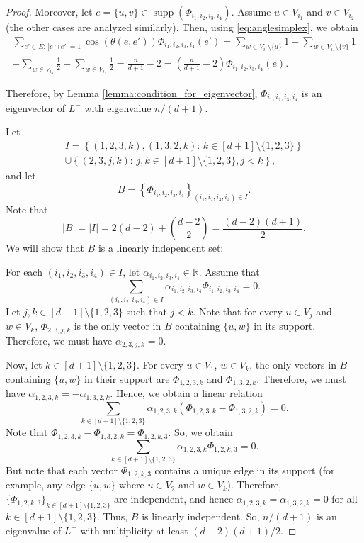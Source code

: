 \documentclass[a4paper,11pt]{article}
\theoremstyle{plain}
\theoremstyle{definition}
\newcommand{\Rea}{{\mathbb R}}
\DeclareMathOperator{\supp}{\text{supp}}
\begin{document}
\begin{proof}
Moreover, let $e=\{u,v\}\in\supp(\Phi_{i_1,i_2,i_3,i_4})$. 
Assume $u\in V_{i_1}$ and $v\in V_{i_2}$ (the other cases are analyzed similarly). Then, using \eqref{eq:anglesimplex}, we obtain
\begin{multline*}
        \sum_{e'\in E:\, |e\cap e'|=1} \cos(\theta(e,e'))\Phi_{i_1,i_2,i_3,i_4}(e')=\sum_{w\in V_{i_1}\setminus\{u\}} 1 + \sum_{w\in V_{i_2}\setminus\{v\}} 1 \\-\sum_{w\in V_{i_3}}\frac{1}{2}-\sum_{w\in V_{i_4}}\frac{1}{2}= \frac{n}{d+1}-2= \left(\frac{n}{d+1}-2\right)\Phi_{i_1,i_2,i_3,i_4}(e).
\end{multline*}
 
Therefore, by Lemma \ref{lemma:condition_for_eigenvector}, $\Phi_{i_1,i_2,i_3,i_4}$ is an eigenvector of $L^{-}$ with eigenvalue $n/(d+1)$.

Let 
\begin{multline*}
    I=  \left\{ (1,2,3,k),(1,3,2,k) :\, k\in [d+1]\setminus\{1,2,3\}\right\}
    \\
    \cup \left\{ (2,3,j,k)  :\, j,k\in[d+1]\setminus\{1,2,3\},j<k \right\},
\end{multline*}
and let
\[
    B= \left\{ \Phi_{i_1,i_2,i_3,i_4}\right\}_{(i_1,i_2,i_3,i_4)\in I}.
\]
Note that
\[
    |B|= |I|= 2(d-2)+ \binom{d-2}{2} = \frac{(d-2)(d+1)}{2}.
\]
We will show that $B$ is a linearly independent set:

For each $(i_1,i_2,i_3,i_4)\in I$, let $\alpha_{i_1,i_2,i_3,i_4}\in \Rea$. Assume that
\[
    \sum_{(i_1,i_2,i_3,i_4)\in I} \alpha_{i_1,i_2,i_3,i_4} \Phi_{i_1,i_2,i_3,i_4}=0.
\]
Let $j,k\in[d+1]\setminus\{1,2,3\}$ such that $j<k$. Note that for every $u\in V_j$ and $w\in V_k$, $\Phi_{2,3,j,k}$ is the only vector in $B$ containing $\{u,w\}$ in its support. Therefore, we must have $\alpha_{2,3,j,k}=0$.

Now, let $k\in [d+1]\setminus\{1,2,3\}$. For every $u\in V_1$, $w\in V_k$, the only vectors in $B$ containing $\{u,w\}$ in their support are $\Phi_{1,2,3,k}$ and $\Phi_{1,3,2,k}$. Therefore, we must have 
$\alpha_{1,2,3,k}=-\alpha_{1,3,2,k}$.
Hence, we obtain a linear relation
\[
    \sum_{k\in[d+1]\setminus\{1,2,3\}} \alpha_{1,2,3,k} (\Phi_{1,2,3,k}-\Phi_{1,3,2,k})=0.
\]
Note that $\Phi_{1,2,3,k}-\Phi_{1,3,2,k}=\Phi_{1,2,k,3}$. So, we obtain
\[
    \sum_{k\in[d+1]\setminus\{1,2,3\}} \alpha_{1,2,3,k} \Phi_{1,2,k,3}=0.
\]
But note that each vector $\Phi_{1,2,k,3}$ contains a unique edge in its support (for example, any edge $\{u,w\}$ where $u\in V_2$ and $w\in V_k$). Therefore, $\{\Phi_{1,2,k,3}\}_{k\in[d+1]\setminus\{1,2,3\}}$ are independent, and hence $\alpha_{1,2,3,k}=\alpha_{1,3,2,k}=0$ for all $k\in[d+1]\setminus\{1,2,3\}$. Thus, $B$ is linearly independent.
So, $n/(d+1)$ is an eigenvalue of $L^{-}$ with multiplicity at least $(d-2)(d+1)/2$.


\end{proof}
\end{document}
